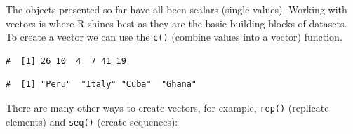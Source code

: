 \documentclass[a4paper,9pt,twocolumn,twoside,printwatermark=false]{pinp}
\begin{document}
The objects presented so far have all been scalars (single values).
Working with vectors is where R shines best as they are the basic
building blocks of datasets. To create a vector we can use the
\texttt{c()} (combine values into a vector) function.

\begin{Shaded}
\begin{Highlighting}[]
\StringTok{ }\NormalTok{(}\NormalTok{, }\NormalTok{, }\NormalTok{, }\NormalTok{, }\NormalTok{, }\NormalTok{)}
\end{Highlighting}
\end{Shaded}

\begin{ShadedResult}
\begin{verbatim}
#  [1] 26 10  4  7 41 19
\end{verbatim}
\end{ShadedResult}

\begin{Shaded}
\begin{Highlighting}[]
\StringTok{ }\NormalTok{(}\NormalTok{, }\NormalTok{, }\NormalTok{, }\NormalTok{)  }
\end{Highlighting}
\end{Shaded}

\begin{ShadedResult}
\begin{verbatim}
#  [1] "Peru"  "Italy" "Cuba"  "Ghana"
\end{verbatim}
\end{ShadedResult}

There are many other ways to create vectors, for example, \texttt{rep()}
(replicate elements) and \texttt{seq()} (create sequences):

\begin{Shaded}
\begin{Highlighting}[]
\StringTok{ }\NormalTok{(}\NormalTok{(}\NormalTok{, }\NormalTok{, }\NormalTok{, }\NormalTok{), }\NormalTok{)}
\end{Highlighting}
\end{Shaded}
\end{document}

